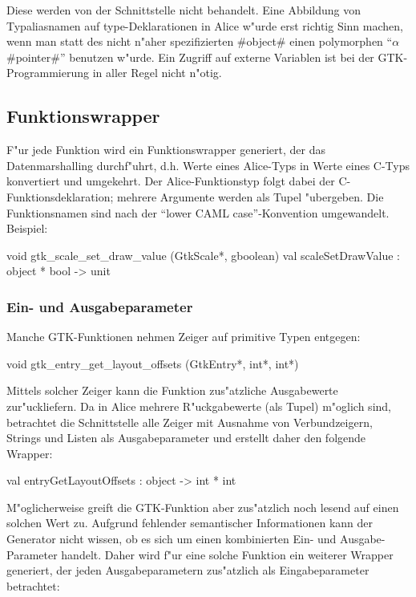 \documentclass[a4paper,titlepage]{article}
\newenvironment{code}{\verbatim}{\endverbatim}
\begin{document}
Diese werden von
der Schnittstelle nicht behandelt. Eine Abbildung von Typaliasnamen auf
type-Deklarationen in Alice w"urde erst richtig Sinn machen, wenn man
statt des nicht n"aher spezifizierten #object# einen polymorphen
``$\alpha$ #pointer#'' benutzen w"urde. Ein Zugriff auf externe Variablen
ist bei der GTK-Programmierung in aller Regel nicht n"otig.

\subsection{Funktionswrapper}

F"ur jede Funktion wird ein Funktionswrapper generiert, der das
Datenmarshalling durch\-f"uhrt, d.h. Werte eines Alice-Typs in Werte eines
C-Typs konvertiert und umgekehrt. Der Alice-Funktionstyp folgt dabei der
C-Funktionsdeklaration; mehrere Argumente werden als Tupel "ubergeben.
Die Funktionsnamen sind nach der ``lower CAML case''-Konvention
umgewandelt. Beispiel:

\begin{code}
void gtk_scale_set_draw_value (GtkScale*, gboolean)
val scaleSetDrawValue : object * bool -> unit
\end{code}

\subsubsection*{Ein- und Ausgabeparameter}

Manche GTK-Funktionen nehmen Zeiger auf primitive Typen entgegen:

\begin{code}
void gtk_entry_get_layout_offsets (GtkEntry*, int*, int*)
\end{code}

Mittels solcher Zeiger kann die Funktion zus"atzliche Ausgabewerte
zur"uckliefern. Da in Alice mehrere R"uckgabewerte (als Tupel) m"oglich sind,
betrachtet die Schnittstelle alle Zeiger mit Ausnahme von Verbundzeigern,
Strings und Listen als Ausgabeparameter und erstellt daher den folgende
Wrapper:

\begin{code}
val entryGetLayoutOffsets : object -> int * int
\end{code}

M"oglicherweise greift die GTK-Funktion aber zus"atzlich noch lesend auf 
einen solchen Wert zu. Aufgrund fehlender semantischer Informationen kann
der Generator nicht wissen, ob es sich um einen kombinierten Ein- und
Ausgabe-Parameter handelt.
Daher wird f"ur eine solche Funktion ein weiterer Wrapper generiert,
der jeden Ausgabeparametern zus"atzlich als Eingabeparameter betrachtet:
\end{document}
